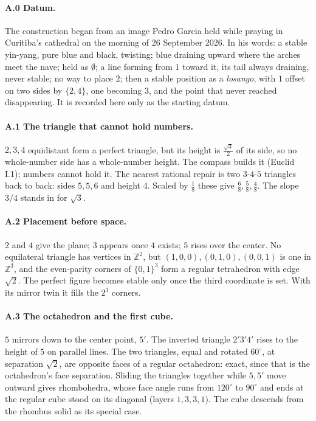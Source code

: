 \documentclass[11pt]{article}
\newcommand{\Z}{\mathbb{Z}}
\theoremstyle{definition}\newtheorem{claim}{Capability}
\theoremstyle{remark}
\begin{document}
\paragraph{A.0 Datum.} The construction began from an image Pedro Garcia held while praying in Curitiba's cathedral on the morning of 26 September 2026. In his words: a stable yin-yang, pure blue and black, twisting; blue draining upward where the arches meet the nave; held as $\emptyset$; a line forming from $1$ toward it, its tail always draining, never stable; no way to place $2$; then a stable position as a \emph{losango}, with $1$ offset on two sides by $\{2,4\}$, one becoming $3$, and the point that never reached disappearing. It is recorded here only as the starting datum.

\paragraph{A.1 The triangle that cannot hold numbers.} $2,3,4$ equidistant form a perfect triangle, but its height is $\tfrac{\sqrt3}{2}$ of its side, so no whole-number side has a whole-number height. The compass builds it (Euclid I.1); numbers cannot hold it. The nearest rational repair is two $3$-$4$-$5$ triangles back to back: sides $5,5,6$ and height $4$. Scaled by $\tfrac18$ these give $\tfrac68,\tfrac58,\tfrac48$. The slope $3/4$ stands in for $\sqrt3$.

\paragraph{A.2 Placement before space.} $2$ and $4$ give the plane; $3$ appears once $4$ exists; $5$ rises over the center. No equilateral triangle has vertices in $\Z^2$, but $(1,0,0),(0,1,0),(0,0,1)$ is one in $\Z^3$, and the even-parity corners of $\{0,1\}^3$ form a regular tetrahedron with edge $\sqrt2$. The perfect figure becomes stable only once the third coordinate is set. With its mirror twin it fills the $2^3$ corners.

\paragraph{A.3 The octahedron and the first cube.} $5$ mirrors down to the center point, $5'$. The inverted triangle $2'3'4'$ rises to the height of $5$ on parallel lines. The two triangles, equal and rotated $60^\circ$, at separation $\sqrt2$, are opposite faces of a regular octahedron: exact, since that is the octahedron's face separation. Sliding the triangles together while $5,5'$ move outward gives rhombohedra, whose face angle runs from $120^\circ$ to $90^\circ$ and ends at the regular cube stood on its diagonal (layers $1,3,3,1$). The cube descends from the rhombus solid as its special case.
\end{document}
